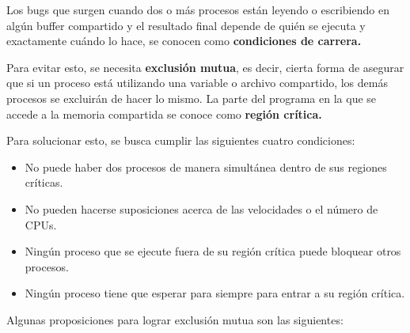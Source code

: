 Los bugs que surgen cuando dos o más procesos están leyendo o escribiendo en algún buffer compartido y el resultado final depende de quién se ejecuta y exactamente cuándo lo hace, se conocen como \textbf{condiciones de carrera.}

Para evitar esto, se necesita \textbf{exclusión mutua}, es decir, cierta forma de asegurar que si un proceso está utilizando una variable o archivo compartido, los demás procesos se excluirán de hacer lo mismo. La parte del programa en la que se accede a la memoria compartida se conoce como \textbf{región crítica.}

Para solucionar esto, se busca cumplir las siguientes cuatro condiciones:

\begin{itemize}
\item No puede haber dos procesos de manera simultánea dentro de sus regiones críticas.
\item No pueden hacerse suposiciones acerca de las velocidades o el número de CPUs.
\item Ningún proceso que se ejecute fuera de su región crítica puede bloquear otros procesos.
\item Ningún proceso tiene que esperar para siempre para entrar a su región crítica.
\end{itemize}

Algunas proposiciones para lograr exclusión mutua son las siguientes:

